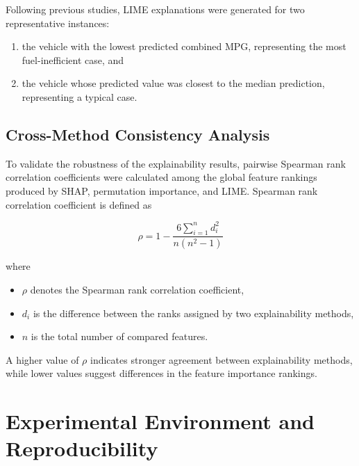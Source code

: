 Following previous studies, LIME explanations were generated for two representative instances:

\begin{enumerate}
\item the vehicle with the lowest predicted combined MPG, representing the most fuel-inefficient case, and
\item the vehicle whose predicted value was closest to the median prediction, representing a typical case.
\end{enumerate}


\subsection{Cross-Method Consistency Analysis}

To validate the robustness of the explainability results, pairwise Spearman rank correlation coefficients were calculated among the global feature rankings produced by SHAP, permutation importance, and LIME. Spearman rank correlation coefficient is defined as

\begin{equation}
\rho
=
1-
\frac{
6\sum_{i=1}^{n}d_i^2
}
{
n(n^2-1)
}
\label{eq:spearman}
\end{equation}

where

\begin{itemize}
\item $\rho$ denotes the Spearman rank correlation coefficient,
\item $d_i$ is the difference between the ranks assigned by two explainability methods,
\item $n$ is the total number of compared features.
\end{itemize}

A higher value of $\rho$ indicates stronger agreement between explainability methods, while lower values suggest differences in the feature importance rankings.

\section{Experimental Environment and Reproducibility}

